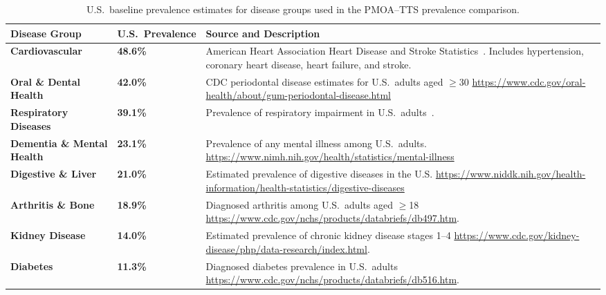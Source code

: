 \vspace{-3.5mm}
\begin{table}[!htbp]
\footnotesize
\centering
\caption{U.S.\ baseline prevalence estimates for disease groups used in the PMOA--TTS prevalence comparison.}
\label{tab:us_disease_prevalence_sources}
\begin{tabular}{p{3.6cm} p{2.2cm} p{7.8cm}}
\toprule
\textbf{Disease Group} & \textbf{U.S.\ Prevalence} & \textbf{Source and Description} \\
\midrule

\textbf{Cardiovascular} & \textbf{48.6\%} &
American Heart Association Heart Disease and Stroke Statistics~\cite{tsao2023heart}.
Includes hypertension, coronary heart disease, heart failure, and stroke. \\[5pt]

\textbf{Oral \& Dental Health} & \textbf{42.0\%} &
CDC periodontal disease estimates for U.S.\ adults aged $\geq$30 \url{https://www.cdc.gov/oral-health/about/gum-periodontal-disease.html} \\[5pt]

\textbf{Respiratory Diseases} & \textbf{39.1\%} &
Prevalence of respiratory impairment in U.S.\ adults~\cite{pleasants2022respiratory}. \\[5pt]

\textbf{Dementia \& Mental Health} & \textbf{23.1\%} &
Prevalence of any mental illness among U.S.\ adults. \url{https://www.nimh.nih.gov/health/statistics/mental-illness} \\[5pt]

\textbf{Digestive \& Liver} & \textbf{21.0\%} &
Estimated prevalence of digestive diseases in the U.S. \url{https://www.niddk.nih.gov/health-information/health-statistics/digestive-diseases} \\[5pt]

\textbf{Arthritis \& Bone} & \textbf{18.9\%} &
Diagnosed arthritis among U.S.\ adults aged $\geq$18 \url{https://www.cdc.gov/nchs/products/databriefs/db497.htm}. \\[5pt]

\textbf{Kidney Disease} & \textbf{14.0\%} &
Estimated prevalence of chronic kidney disease stages 1--4 \url{https://www.cdc.gov/kidney-disease/php/data-research/index.html}. \\[5pt]

\textbf{Diabetes} & \textbf{11.3\%} &
Diagnosed diabetes prevalence in U.S.\ adults \url{https://www.cdc.gov/nchs/products/databriefs/db516.htm}. \\[5pt]


\end{tabular}
\end{table}
